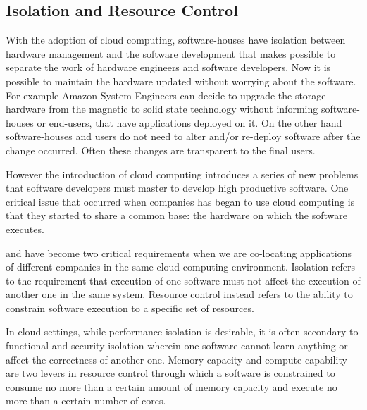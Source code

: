 \subsection{Isolation and Resource Control}
\label{sec:background-cloudComputing-isolationResource}
With the adoption of cloud computing, software-houses have isolation between hardware management and the software
development that makes possible to separate the work of hardware engineers and software developers.
Now it is possible to maintain the hardware updated without worrying about the software. For example Amazon
System Engineers can decide to upgrade the storage hardware from the magnetic to solid state technology without
informing software-houses or end-users, that have applications deployed on it. On the other hand software-houses
and users do not need to alter and/or re-deploy software after the change occurred. Often these changes are
transparent to the final users. 

However the introduction of cloud computing introduces a series of new problems that software developers must
master to develop high productive software. One critical issue that occurred when companies has began to use cloud 
computing is that they started to share a common base: the hardware on which the software executes.

 and  have become two critical requirements when we are co-locating
applications of different companies in the same cloud computing environment. Isolation refers to the requirement
that execution of one software must not affect the execution of another one in the same system. Resource control
instead refers to the ability to constrain software execution to a specific set of resources.

In cloud settings, while performance isolation is desirable, it is often secondary to functional and security
isolation wherein one software cannot learn anything or affect the correctness of another one. Memory capacity
and compute capability are two levers in resource control through which a software is constrained to consume
no more than a certain amount of memory capacity and execute no more than a certain number of cores.